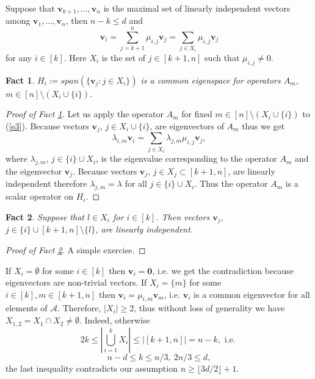 \documentclass[12pt,nopagetitle]{article}
\theoremstyle{plain}
\newtheorem{fact}{Fact}
\theoremstyle{definition}
\begin{document}
Suppose that $\mathbf v_{k+1}, \dots, \mathbf v_{n}$ is the maximal set of linearly independent vectors among $\mathbf v_1, \dots, \mathbf v_n$, then $n-k\leqslant d$ and
\begin{equation}\label{e3}
\mathbf v_i=\sum_{j=k+1}^n \mu_{i,j}\mathbf v_j=\sum_{j\in X_i} \mu_{i,j} \mathbf v_j
\end{equation}
for any $i\in[k]$. Here $X_i$ is the set of $j\in[k+1,n]$ such that $\mu_{i,j}\ne0$.
 \begin{fact} \label{f2}
$H_i:=span (\{\mathbf v_j:j\in X_i\})$ is a common eigenspace for operators $A_m$, $m\in [n]\setminus (X_i\cup \{i\})$.
\end{fact}
\begin{proof}[Proof of Fact \ref{f2}] Let us apply the operator $A_m$ for fixed $m\in [n]\setminus (X_i\cup \{i\})$ to (\ref{e3}). Because vectors $\mathbf v_j$, $j\in X_i\cup \{i\}$, are eigenvectors of $A_m$ thus we get
$$\lambda_{i,m} \mathbf v_i=\sum_{j\in X_i}\lambda_{j,m}\mu_{i,j}\mathbf v_j,$$
where $\lambda_{j,m}$, $j\in\{i\}\cup X_i$, is the eigenvalue corresponding to the operator $A_m$ and the eigenvector $\mathbf v_j$. Because vectors $\mathbf v_j$, $j\in X_j\subset [k+1, n]$, are linearly independent therefore $\lambda_{j,m}=\lambda$ for all $j\in\{i\}\cup X_i$. Thus the operator $A_m$ is a scalar operator on $H_i$.
\end{proof}
		
\begin{fact} \label{f3}
			Suppose that $l\in X_i$ for $i\in[k]$. Then vectors $\mathbf v_j$, $j\in \{i\}\cup [k+1,n]\setminus \{l\}$, are linearly independent.
		\end{fact}
		
\begin{proof}[Proof of Fact \ref{f3}] 
A simple exercise.
\end{proof}
If $X_i=\emptyset$ for some $i\in [k]$ then $\mathbf v_i=\mathbf 0$, i.e. we get the contradiction because eigenvectors are non-trivial vectors. If $X_i=\{m\}$ for some $i\in [k], m\in [k+1, n]$ then $\mathbf v_i=\mu_{i,m} \mathbf v_m$, i.e. $\mathbf v_i$ is a common eigenvector for all elements of $\mathcal{A}$. Therefore, $|X_i|\geqslant 2$,  thus without loss of generality we have $X_{1,2}=X_1\cap X_2\ne \emptyset$. Indeed, otherwise
$$2k\leqslant \left|\bigcup_{i=1}^k X_i\right|\leqslant |[k+1,n]|= n-k, \text{ i.e. } $$ 
$$n-d\leqslant k\leqslant n/3,\ 2n/3\leqslant d,$$
		the last inequality contradicts our assumption $n\geqslant \lfloor3d/2\rfloor+1$.
		
\end{document}
